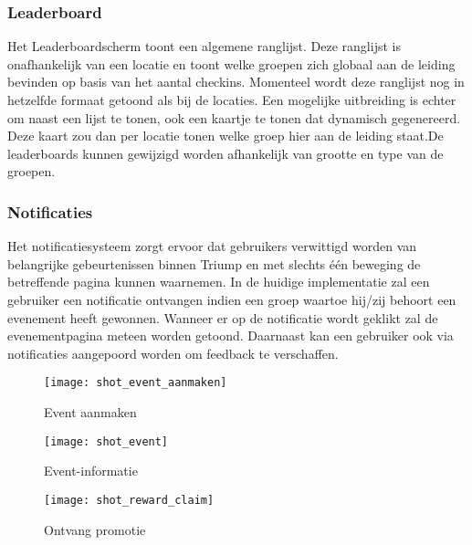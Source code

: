 \subsubsection{Leaderboard}%
Het Leaderboardscherm toont een algemene ranglijst. Deze ranglijst is onafhankelijk van een locatie en toont welke groepen zich globaal aan de leiding bevinden op basis van het aantal checkins. Momenteel wordt deze ranglijst nog in hetzelfde formaat getoond als bij de locaties. Een mogelijke uitbreiding is echter om naast een lijst te tonen, ook een kaartje te tonen dat dynamisch gegenereerd. Deze kaart zou dan per locatie tonen welke groep hier aan de leiding staat.De leaderboards kunnen gewijzigd worden afhankelijk van grootte en type van de groepen.



\subsubsection{Notificaties} %
Het notificatiesysteem zorgt ervoor dat gebruikers verwittigd worden van belangrijke gebeurtenissen binnen Triump en met slechts één beweging de betreffende pagina kunnen waarnemen. In de huidige implementatie zal een gebruiker een notificatie ontvangen indien een groep waartoe hij/zij behoort een evenement heeft gewonnen. Wanneer er op de notificatie wordt geklikt zal de evenementpagina meteen worden getoond. Daarnaast kan een gebruiker ook via notificaties aangepoord worden om feedback te verschaffen.   

\begin{figure}[ht]

\begin{minipage}[b]{0.25\linewidth}
\centering
\texttt{[image: shot\_event\_aanmaken]}
\caption{Event aanmaken}
\label{fig:shot_event_aanmaken}
\end{minipage}
\hspace{1.8cm}
\begin{minipage}[b]{0.25\linewidth}
\centering
\texttt{[image: shot\_event]}
\caption{Event-informatie}
\label{fig:shot_event}
\end{minipage}
\hspace{1.8cm}
\begin{minipage}[b]{0.25\linewidth}
\centering
\texttt{[image: shot\_reward\_claim]}
\caption{Ontvang promotie}
\label{fig:shot_reward_claim}
\end{minipage}
\end{figure}
\clearpage

